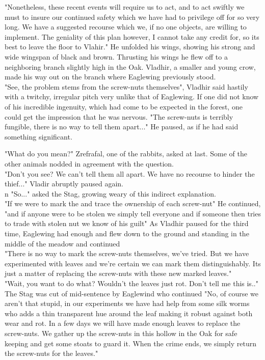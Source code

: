 \documentclass[smalldemyvopaper,11pt,twoside,onecolumn,openright,extrafontsizes]{memoir}
\begin{document}
"Nonetheless, these recent events will require us to act, and to act swiftly we must to insure our continued safety which we have had to privilege off for so very long. We have a suggested recourse which we, if no one objects, are willing to implement. The geniality of this plan however, I cannot take any credit for, so its best to leave the floor to Vlahir." He unfolded his wings, showing his strong and wide wingspan of black and brown. Thrusting his wings he flew off to a neighboring branch slightly high in the Oak. Vladhir, a smaller and young crow, made his way out on the branch where Eaglewing previously stood.\\

"See, the problem stems from the screw-nuts themselves", Vladhir said hastily with a twitchy, irregular pitch very unlike that of Eaglewing. If one did not know of his incredible ingenuity, which had come to be expected in the forest, one could get the impression that he was nervous. "The screw-nuts is terribly fungible, there is no way to tell them apart..." He paused, as if he had said something significant.  

"What do you mean?" Zrefrafal, one of the rabbits, asked at last. Some of the other animals nodded in agreement with the question.\\

"Don't you see? We can't tell them all apart. We have no recourse to hinder the thief..." Vladir abruptly paused again.\\
n
"So..." asked the Stag, growing weary of this indirect explanation.\\

"If we were to mark the and trace the ownership of each screw-nut" He continued, "and if anyone were to be stolen we simply tell everyone and if someone then tries to trade with stolen nut we know of his guilt" As Vladhir paused for the third time, Eaglewing had enough and flew down to the ground and standing in the middle of the meadow and continued \\

"There is no way to mark the screw-nuts themselves, we've tried. But we have experimented with leaves and we're certain we can mark them distinguishably. Its just a matter of replacing the screw-nuts with these new marked leaves."\\

"Wait, you want to do what? Wouldn't the leaves just rot. Don't tell me this is.." The Stag was cut of mid-sentence by Eaglewind who continued
"No, of course we aren't that stupid, in our experiments we have had help from some silk worms who adds a thin transparent hue around the leaf making it robust against both wear and rot. In a few days we will have made enough leaves to replace the screw-nuts. We gather up the screw-nuts in this hollow in the Oak for safe keeping and get some stoats to guard it. When the crime ends, we simply return the screw-nuts for the leaves."\\
\end{document}
